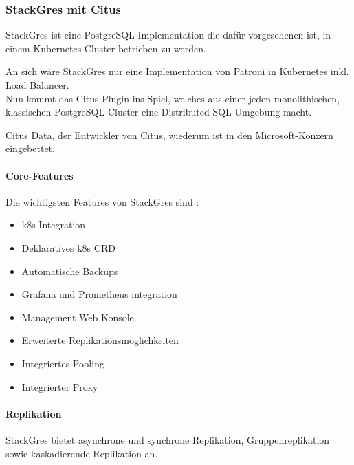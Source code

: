 \subsubsection{StackGres mit Citus}
\begin{flushleft} 
    StackGres ist eine \Gls{PostgreSQL}-Implementation die dafür vorgesehenen ist, in einem Kubernetes Cluster betrieben zu werden.
\end{flushleft} 
\begin{flushleft}
    An sich wäre StackGres nur eine Implementation von Patroni in Kubernetes inkl. Load Balancer.\\
    Nun kommt das Citus-Plugin ins Spiel, welches aus einer jeden monolithischen, klassischen \Gls{PostgreSQL Cluster} eine Distributed SQL Umgebung macht.
\end{flushleft}
\begin{flushleft}
    Citus Data, der Entwickler von Citus, wiederum ist in den Microsoft-Konzern eingebettet.
\end{flushleft}
\begin{flushleft}
    \paragraph{Core-Features}
    Die wichtigsten Features von StackGres sind \cite{G3XQA8PI}:
    \begin{itemize}
        \item k8s Integration
        \item Deklaratives k8s CRD
        \item Automatische Backups
        \item Grafana und Prometheus integration
        \item Management Web Konsole
        \item Erweiterte Replikationsmöglichkeiten
        \item Integriertes Pooling
        \item Integrierter Proxy
    \end{itemize}
\end{flushleft}
\clearpage
\begin{flushleft}
    \paragraph{Replikation}
    StackGres bietet asynchrone und synchrone Replikation, Gruppenreplikation sowie kaskadierende Replikation an.
\end{flushleft}
